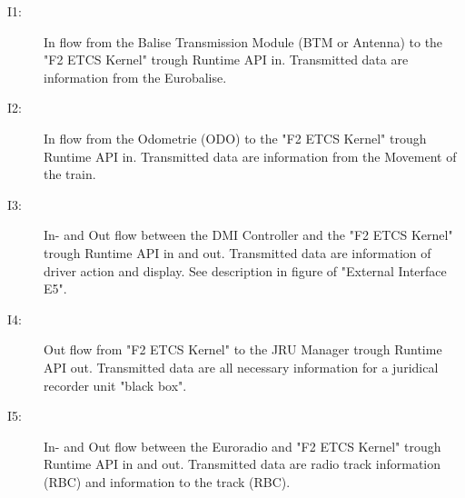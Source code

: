 \begin{description}
\item[I1:] In flow from the Balise Transmission Module (BTM or Antenna) to the "F2 ETCS Kernel" trough Runtime API in. Transmitted data are information from the Eurobalise.

\item[I2:] In flow from the Odometrie (ODO) to the "F2 ETCS Kernel" trough Runtime API in. Transmitted data are information from the Movement of the train.

\item[I3:] In- and Out flow between the DMI Controller and the "F2 ETCS Kernel" trough Runtime API in and out. Transmitted data are information of driver action and display. See description in figure of "External Interface E5".

\item[I4:] Out flow from "F2 ETCS Kernel" to the JRU Manager trough Runtime API out. Transmitted data are all necessary information for a juridical recorder unit "black box".

\item[I5:] In- and Out flow between the Euroradio and "F2 ETCS Kernel" trough Runtime API in and out. Transmitted data are radio track information (RBC) and information to the track (RBC). 
\end{description}

